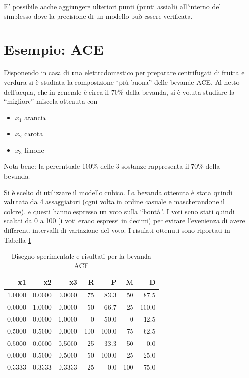 \documentclass[
  11pt,
]{book}
\providecommand{\tightlist}{%
  \setlength{\itemsep}{0pt}\setlength{\parskip}{0pt}}
\begin{document}
E' possibile anche aggiungere ulteriori punti (punti assiali) all'interno del simplesso dove la precisione di un modello può essere verificata.

\hypertarget{esempio-ace}{%
\section{Esempio: ACE}\label{esempio-ace}}

Disponendo in casa di una elettrodomestico per preparare centrifugati di frutta e verdura si è studiata la composizione ``più buona'' delle bevande ACE. Al netto dell'acqua, che in generale è circa il 70\% della bevanda, si è voluta studiare la ``migliore'' miscela ottenuta con

\begin{itemize}
\tightlist
\item
  \(x_1\) arancia
\item
  \(x_2\) carota
\item
  \(x_3\) limone
\end{itemize}

Nota bene: la percentuale 100\% delle 3 sostanze rappresenta il 70\% della bevanda.

Si è scelto di utilizzare il modello cubico. La bevanda ottenuta è stata quindi valutata da 4 assaggiatori (ogni volta in ordine casuale e mascherandone il colore), e questi hanno espresso un voto sulla ``bontà''. I voti sono stati quindi scalati da 0 a 100 (i voti erano espressi in decimi) per evitare l'evenienza di avere differenti intervalli di variazione del voto. I risulati ottenuti sono riportati in Tabella \ref{tab:ace}

\begin{table}

\caption{\label{tab:ace}Disegno sperimentale e risultati per la bevanda ACE}
\centering
\begin{tabular}[t]{r|r|r|r|r|r|r}
\hline
x1 & x2 & x3 & R & P & M & D\\
\hline
1.0000 & 0.0000 & 0.0000 & 75 & 83.3 & 50 & 87.5\\
\hline
0.0000 & 1.0000 & 0.0000 & 50 & 66.7 & 25 & 100.0\\
\hline
0.0000 & 0.0000 & 1.0000 & 0 & 50.0 & 0 & 12.5\\
\hline
0.5000 & 0.5000 & 0.0000 & 100 & 100.0 & 75 & 62.5\\
\hline
0.5000 & 0.0000 & 0.5000 & 25 & 33.3 & 50 & 0.0\\
\hline
0.0000 & 0.5000 & 0.5000 & 50 & 100.0 & 25 & 25.0\\
\hline
0.3333 & 0.3333 & 0.3333 & 25 & 0.0 & 100 & 75.0\\
\hline
\end{tabular}
\end{table}
\end{document}

